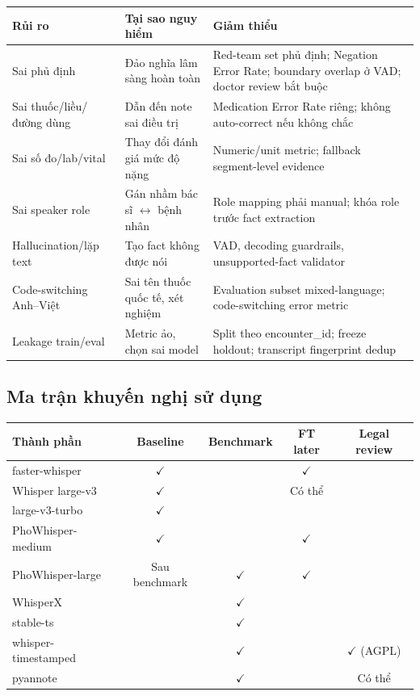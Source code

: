 \begin{small}
\begin{longtable}{p{3.2cm} p{4cm} p{6.5cm}}
\toprule
\textbf{Rủi ro} & \textbf{Tại sao nguy hiểm} & \textbf{Giảm thiểu} \\
\midrule
Sai phủ định & Đảo nghĩa lâm sàng hoàn toàn & Red-team set phủ định; Negation Error Rate; boundary overlap ở VAD; doctor review bắt buộc \\
\midrule
Sai thuốc/liều/đường dùng & Dẫn đến note sai điều trị & Medication Error Rate riêng; không auto-correct nếu không chắc \\
\midrule
Sai số đo/lab/vital & Thay đổi đánh giá mức độ nặng & Numeric/unit metric; fallback segment-level evidence \\
\midrule
Sai speaker role & Gán nhầm bác sĩ $\leftrightarrow$ bệnh nhân & Role mapping phải manual; khóa role trước fact extraction \\
\midrule
Hallucination/lặp text & Tạo fact không được nói & VAD, decoding guardrails, unsupported-fact validator \\
\midrule
Code-switching Anh--Việt & Sai tên thuốc quốc tế, xét nghiệm & Evaluation subset mixed-language; code-switching error metric \\
\midrule
Leakage train/eval & Metric ảo, chọn sai model & Split theo encounter\_id; freeze holdout; transcript fingerprint dedup \\
\bottomrule
\end{longtable}
\end{small}

\subsection{Ma trận khuyến nghị sử dụng}

\begin{small}
\begin{longtable}{p{2.8cm} c c c c}
\toprule
\textbf{Thành phần} & \textbf{Baseline} & \textbf{Benchmark} & \textbf{FT later} & \textbf{Legal review} \\
\midrule
faster-whisper & $\checkmark$ & & $\checkmark$ & \\
Whisper large-v3 & $\checkmark$ & & Có thể & \\
large-v3-turbo & $\checkmark$ & & & \\
PhoWhisper-medium & $\checkmark$ & & $\checkmark$ & \\
PhoWhisper-large & Sau benchmark & $\checkmark$ & $\checkmark$ & \\
WhisperX & & $\checkmark$ & & \\
stable-ts & & $\checkmark$ & & \\
whisper-timestamped & & $\checkmark$ & & $\checkmark$ (AGPL) \\
pyannote & & $\checkmark$ & & Có thể \\
\bottomrule
\end{longtable}
\end{small}

